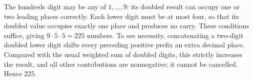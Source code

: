 The hundreds digit may be any of $1,\ldots,9$: its doubled result can occupy one or two leading places correctly. Each lower digit must be at most four, so that its doubled value occupies exactly one place and produces no carry. These conditions suffice, giving $9\cdot5\cdot5=225$ numbers.
To see necessity, concatenating a two-digit doubled lower digit shifts every preceding positive prefix an extra decimal place. Compared with the usual weighted sum of doubled digits, this strictly increases the result, and all other contributions are nonnegative; it cannot be cancelled. Hence $\boxed{225}$.
